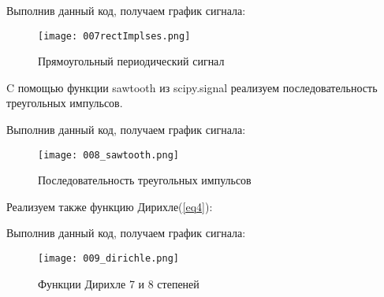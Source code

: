 
\parindent=1cm %
\noindent  Выполнив данный код, получаем график сигнала:
\begin{figure}[H]
	\begin{center}
		\texttt{[image: 007rectImplses.png]}
		\caption{Прямоугольный периодический сигнал} 
		\label{pic:pic07} %
	\end{center}
\end{figure}

C помощью функции sawtooth из scipy.signal реализуем последовательность треугольных импульсов.


\parindent=1cm %
\noindent  Выполнив данный код, получаем график сигнала:
\begin{figure}[H]
	\begin{center}
		\texttt{[image: 008\_sawtooth.png]}
		\caption{Последовательность треугольных импульсов} 
		\label{pic:pic08} %
	\end{center}
\end{figure}

Реализуем также функцию Дирихле(\ref{eq4}):


\parindent=1cm %
\noindent  Выполнив данный код, получаем график сигнала:
\begin{figure}[H]
	\begin{center}
		\texttt{[image: 009\_dirichle.png]}
		\caption{Функции Дирихле 7 и 8 степеней} 
		\label{pic:pic09} %
	\end{center}
\end{figure}



